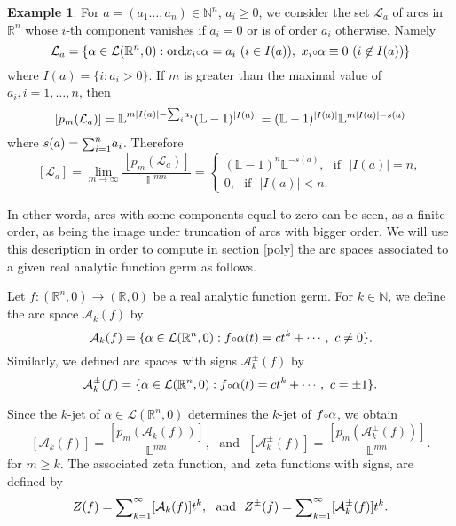\documentclass[12pt,a4paper,leqno]{amsart}
\theoremstyle{definition}
\newtheorem{exam}[thm]{Example}
\begin{document}
\begin{exam}\label{ex1}
For $a=(a_1\dots,a_n)\in{\mathbb{N}}^n$, $a_i\ge 0$, we consider the set
$\mathcal{L}_a$ of arcs in $\mathbb R^n$ whose $i$-th component
vanishes if $a_i=0$ or is of order $a_i$ otherwise. Namely
$$
\mathcal{L}_a=\{\alpha\in\mathcal L({\mathbb{R}}^n,0):
{\mathop{\mathrm{ord}}\nolimits} x_i{\text{\scriptsize$\circ$}}\alpha=a_i\ (i\in I(a)),\ 
x_i{\text{\scriptsize$\circ$}}\alpha\equiv 0\ (i\not\in I(a))\}
$$
where $I(a)=\{i:a_i>0\}$. 
If $m$ is greater than the maximal value of $a_i, i=1,\ldots,n$, then 
$$
[p_m(\mathcal L_a)]=
{\mathbb{L}}^{m|I(a)|-{\mathop{\textrm{\scriptsize $\mathop\sum$}}}_{i}a_i}({\mathbb{L}}-1)^{|I(a)|}
=({\mathbb{L}}-1)^{|I(a)|}{\mathbb{L}}^{m|I(a)|-s(a)}
$$ 
where 
$s(a)={\mathop{\textrm{\scriptsize $\mathop\sum$}}}_{i=1}^na_i$. Therefore 
$$
[\mathcal L_a]=
\lim_{m\to\infty}
\frac{[p_m(\mathcal L_a)]}{{\mathbb{L}}^{mn}}=
\begin{cases}
({\mathbb{L}}-1)^n{\mathbb{L}}^{-s(a)}, \textrm{~~if~~} |I(a)|=n,\\
0, \textrm{~~if~~} |I(a)|<n.
\end{cases}
$$
\end{exam}

In other words, arcs with some components equal to zero can be seen,
as a finite order, as being the image under truncation of arcs with bigger order. We will use this description in order to compute in
section \ref{poly} the arc spaces associated to a given real analytic
function germ as follows. 

Let $f:({\mathbb{R}}^n,0)\to ({\mathbb{R}},0)$ be a real analytic
function germ. For $k\in \mathbb N$, we define the arc space $\mathcal
A_k(f)$ by
$$
\mathcal A_k(f)=
\{\alpha\in\mathcal L({\mathbb{R}}^n,0):f{\text{\scriptsize$\circ$}}\alpha(t)=ct^k+\cdots,\ c\ne0\}.$$
Similarly, we defined arc spaces with signs $\mathcal A^\pm_k(f)$ by
$$\mathcal A^\pm_k(f)=\{\alpha\in\mathcal L({\mathbb{R}}^n,0):f{\text{\scriptsize$\circ$}}\alpha(t)=ct^k+\cdots,\ c=\pm1\}.$$

Since the $k$-jet of $\alpha\in\mathcal L({\mathbb{R}}^n,0)$ 
determines the $k$-jet of $f{\text{\scriptsize$\circ$}}\alpha$, we obtain  
$$
[\mathcal A_k(f)]=\frac{[p_m(\mathcal A_k(f))]}{{\mathbb{L}}^{mn}},\textrm{~~and~~}
[\mathcal A^\pm_k(f)]=\frac{[p_m(\mathcal A^\pm_k(f))]}{{\mathbb{L}}^{mn}}.
$$
for $m\ge k$. The associated zeta function, and zeta functions with signs, are defined by 
$$
Z(f)={\mathop{\textrm{\scriptsize $\mathop\sum$}}}_{k=1}^\infty[\mathcal A_k(f)]t^k,\textrm{~~and~~}
Z^\pm(f)={\mathop{\textrm{\scriptsize $\mathop\sum$}}}_{k=1}^\infty[\mathcal A^\pm_k(f)]t^k. 
$$
\end{document}
